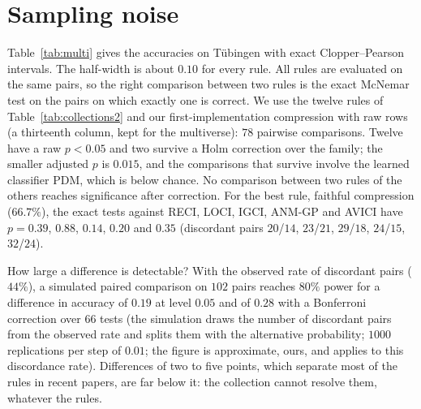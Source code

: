 \section{Sampling noise}\label{sec:noise}

Table~\ref{tab:multi} gives the accuracies on T\"ubingen with exact Clopper--Pearson intervals. The half-width is about $0.10$ for every rule. All rules are evaluated on the same pairs, so the right comparison between two rules is the exact McNemar test on the pairs on which exactly one is correct. We use the twelve rules of Table~\ref{tab:collections2} and our first-implementation compression with raw rows (a thirteenth column, kept for the multiverse): $78$ pairwise comparisons. Twelve have a raw $p<0.05$ and two survive a Holm correction over the family; the smaller adjusted $p$ is $0.015$, and the comparisons that survive involve the learned classifier PDM, which is below chance. No comparison between two rules of the others reaches significance after correction. For the best rule, faithful compression ($66.7\%$), the exact tests against RECI, LOCI, IGCI, ANM-GP and AVICI have $p=0.39$, $0.88$, $0.14$, $0.20$ and $0.35$ (discordant pairs $20$/$14$, $23$/$21$, $29$/$18$, $24$/$15$, $32$/$24$).

How large a difference is detectable? With the observed rate of discordant pairs ($44\%$), a simulated paired comparison on $102$ pairs reaches $80\%$ power for a difference in accuracy of $0.19$ at level $0.05$ and of $0.28$ with a Bonferroni correction over $66$ tests (the simulation draws the number of discordant pairs from the observed rate and splits them with the alternative probability; $1000$ replications per step of $0.01$; the figure is approximate, ours, and applies to this discordance rate). Differences of two to five points, which separate most of the rules in recent papers, are far below it: the collection cannot resolve them, whatever the rules.

